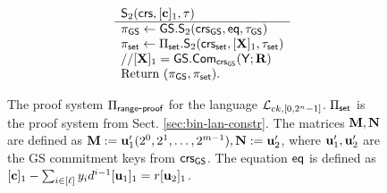 \begin{figure}
\begin{\algSize}
$$\begin{array}{ll}
\begin{array}{l}
\end{array}
&
\begin{array}{l}
{\mathsf{S}_2(\mathsf{crs},[\mathbf{c}]_1,\tau)}\\
\hline
\pi_{\mathsf{GS}}\gets {\mathsf{GS}}.\mathsf{S}_2(\mathsf{crs}_{\mathsf{GS}},\mathsf{eq},\tau_{\mathsf{GS}})\\
\pi_{\mathsf{set}}\gets \Pi_{\mathsf{set}}.\mathsf{S}_2(\mathsf{crs}_{\mathsf{set}},[\mathbf{{X}}]_1,\tau_{\mathsf{set}})\\
//{[\mathbf{{X}}]_1={\mathsf{GS}}.\mathsf{Com}_{\mathsf{crs}_{\mathsf{GS}}}({\mathbf{{\mathsf{Y}}}};\mathbf{{R}})}\\
\text{Return }  (\pi_{\mathsf{GS}},\pi_{\mathsf{set}}).
\end{array}
\end{array}$$
\end{\algSize}
\caption{The proof system $\Pi_{\mathsf{range}\mbox{-}\mathsf{proof}}$ for the language $\mathcal{L}_{ck,[0,2^n-1]}$. $\Pi_{\mathsf{set}}$ is the proof system from Sect. \ref{sec:bin-lan-constr}. The matrices $\mathbf{{M}},\mathbf{{N}}$ are defined as $\mathbf{{M}}:=\mathbf{u}'_1(2^0,2^1,\ldots,2^{m-1}),\mathbf{{N}}:=\mathbf{u}'_2$, where $\mathbf{u}'_1,\mathbf{u}'_2$ are the GS commitment keys from $\mathsf{crs}_{\mathsf{GS}}$. The equation $\mathsf{eq}$ is defined as $[\mathbf{c}]_1-\sum_{i\in[\ell]}{y}_id^{i-1}[\mathbf{u}_1]_1=r[\mathbf{u}_2]_1$.
\label{fig:rp}}
\end{figure}

